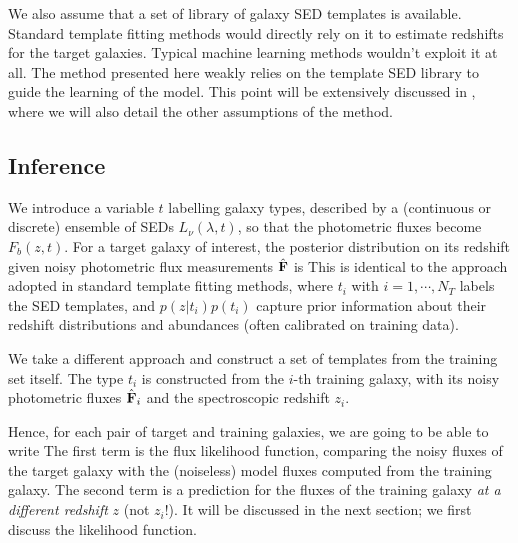 \documentclass[aps,prd,showpacs,superscriptaddress,groupedaddress]{revtex4}  %
\begin{document}
We also assume that a set of library of galaxy SED templates is available. 
Standard template fitting methods would directly rely on it to estimate redshifts for the target galaxies. 
Typical machine learning methods wouldn't exploit it at all. 
The method presented here weakly relies on the template SED library to guide the learning of the model. 
This point will be extensively discussed in , where we will also detail the other assumptions of the method.


\subsection{Inference}

We introduce a variable $t$ labelling galaxy types, described by a (continuous or discrete) ensemble of SEDs $L_\nu(\lambda, t)$, so that the photometric fluxes become $F_b(z, t)$. 
For a target galaxy of interest, the posterior distribution on its redshift given noisy photometric flux measurements $\hat{\mat{F}}$ is
This is identical to the approach adopted in standard template fitting methods, where $t_i$ with $i=1, \cdots, N_T$ labels the SED templates, and $p(z | t_i) p(t_i)$ capture prior information about their redshift distributions and abundances (often calibrated on training data).
  
We take a different approach and construct a set of templates from the training set itself. 
The type $t_i$ is constructed from the $i$-th training galaxy, \ie with its noisy photometric fluxes $\hat{\mat{F}}_i$ and the spectroscopic redshift $z_i$. 

Hence, for each pair of target and training galaxies, we are going to be able to write
The first term is the flux likelihood function, comparing the noisy fluxes of the target galaxy with the (noiseless) model fluxes computed from the training galaxy. 
The second term is a prediction for the fluxes of the training galaxy {\it at a different redshift} $z$ (not $z_i$!). 
It will be discussed in the next section; we first discuss the likelihood function.
\end{document}
